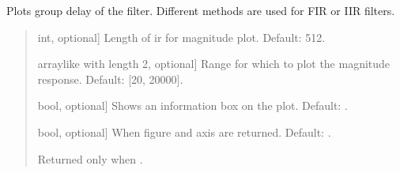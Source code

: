 \documentclass[letterpaper,10pt,english]{sphinxmanual}
\begin{document}
\begin{fulllineitems}
\begin{fulllineitems}
\label{\detokenize{classes:dsptools.classes.filter_class.Filter.plot_group_delay}}
\pysigstartsignatures
{}
\pysigstopsignatures
\sphinxAtStartPar
Plots group delay of the filter. Different methods are used for
FIR or IIR filters.
\begin{quote}\begin{description}
\begin{description}
\sphinxlineitem{\sphinxstylestrong{length\_samples}}{[}int, optional{]}
\sphinxAtStartPar
Length of ir for magnitude plot. Default: 512.

\sphinxlineitem{\sphinxstylestrong{range\_hz}}{[}array\sphinxhyphen{}like with length 2, optional{]}
\sphinxAtStartPar
Range for which to plot the magnitude response.
Default: {[}20, 20000{]}.

\sphinxlineitem{\sphinxstylestrong{show\_info\_box}}{[}bool, optional{]}
\sphinxAtStartPar
Shows an information box on the plot. Default: .

\sphinxlineitem{\sphinxstylestrong{returns}}{[}bool, optional{]}
\sphinxAtStartPar
When  figure and axis are returned. Default: .

\end{description}

\begin{description}
\sphinxAtStartPar
Returned only when .

\end{description}

\end{description}\end{quote}


\end{fulllineitems}
\end{fulllineitems}
\end{document}
